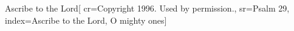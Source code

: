 {Ascribe to the Lord}[
    cr={Copyright 1996.  Used by permission.},
    sr={Psalm 29},
    index={Ascribe to the Lord, O mighty ones}]
